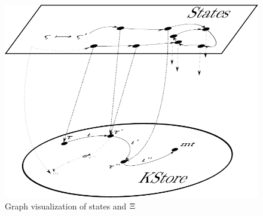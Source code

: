 \begin{figure}
  \centering
  \includegraphics[scale=0.65]{xigraph-cloud}
  \caption{Graph visualization of states and $\Xi$}
  \label{fig:pushdown-vis}
\end{figure}

